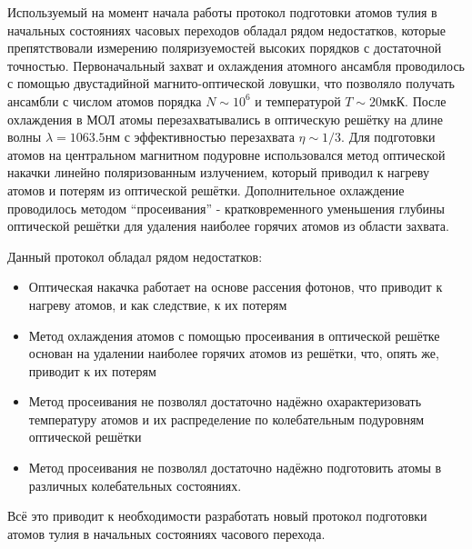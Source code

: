 Используемый на момент начала работы протокол подготовки атомов тулия в начальных состояниях часовых переходов обладал рядом недостатков, которые препятствовали измерению поляризуемостей высоких порядков с достаточной точностью. 
Первоначальный захват и охлаждения атомного ансамбля проводилось с помощью двустадийной магнито-оптической ловушки, что позволяло получать ансамбли с числом атомов порядка $N\sim10^6$ и температурой $T\sim20\unit{мкК}$.
После охлаждения в МОЛ атомы перезахватывались в оптическую решётку на длине волны $\lambda=1063.5\unit{нм}$ с эффективностью перезахвата $\eta\sim1/3$.
Для подготовки атомов на центральном магнитном подуровне использовался метод оптической накачки линейно поляризованным излучением, который приводил к нагреву атомов и потерям из оптической решётки. 
Дополнительное охлаждение проводилось методом ``просеивания'' - кратковременного уменьшения глубины оптической решётки для удаления наиболее горячих атомов из области захвата. 

Данный протокол обладал рядом недостатков:
\begin{itemize}
	\item Оптическая накачка работает на основе рассения фотонов, что приводит к нагреву атомов, и как следствие, к их потерям
	\item Метод охлаждения атомов с помощью просеивания в оптической решётке основан на удалении наиболее горячих атомов из решётки, что, опять же, приводит к их потерям
	\item Метод просеивания не позволял достаточно надёжно охарактеризовать температуру атомов и их распределение по колебательным подуровням оптической решётки
	\item Метод просеивания не позволял достаточно надёжно подготовить атомы в различных колебательных состояниях.
\end{itemize}
Всё это приводит к необходимости разработать новый протокол подготовки атомов тулия в начальных состояниях часового перехода.
%


